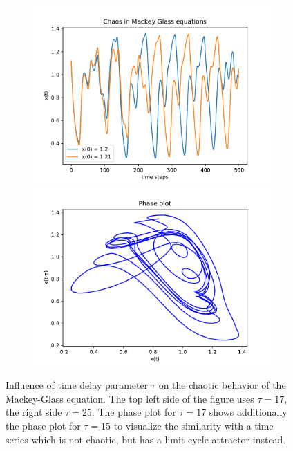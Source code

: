 \documentclass{article}
\begin{document}
\begin{figure}
\begin{subfigure}{.51\textwidth}
        \includegraphics[width=\textwidth]{figures/mg_chaos_25.pdf}
        \includegraphics[width=\textwidth]{figures/25.pdf}
    \end{subfigure}
    \caption{Influence of time delay parameter $\tau$ on the chaotic behavior of
        the Mackey-Glass equation. The top left side of the figure
        uses $\tau = 17$, the right side $\tau = 25$. The phase plot for 
        $\tau=17$ shows additionally the phase plot for $\tau=15$ to visualize 
        the similarity with a time series which is not chaotic, but has 
        a limit cycle attractor instead.}
    \label{fig:mackey_chaos}
\end{figure}
\end{document}
